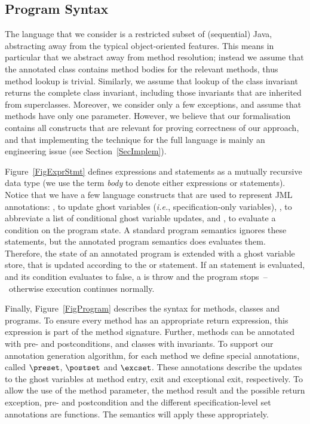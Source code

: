 \subsection{Program Syntax}\label{SecSyntax}

The language that we consider is a restricted subset of (sequential)
Java, abstracting away from the typical object-oriented features. This
means in particular that we abstract away from method resolution;
instead we assume that the annotated class contains method bodies for
the relevant methods, thus method lookup is trivial. Similarly, we
assume that lookup of the class invariant returns the complete class
invariant, including those invariants that are inherited from
superclasses. Moreover, we consider only a few exceptions, and assume
that methods have only one parameter. However, we believe that our
formalisation contains all constructs that are relevant for proving
correctness of our approach, and that implementing the technique for
the full language is mainly an engineering issue (see
Section~\ref{SecImplem}).


Figure~\ref{FigExprStmt} defines expressions and statements as a
mutually recursive data type (we use the term \emph{body} to denote
either expressions or statements). Notice that we have a few language
constructs that are used to represent JML annotations: \Set, to update
ghost variables (\emph{i.e.}, specification-only variables), \CaseJML,
to abbreviate a list of conditional ghost variable updates, and
\Assert, to evaluate a condition on the program state. A standard
program semantics ignores these statements, but the annotated program
semantics does evaluates them. Therefore, the state of an annotated
program is extended with a ghost variable store, that is updated
according to the \Set or
\CaseJML statement. If an \Assert statement is evaluated, and its
condition evaluates to false, a \JMLExc is throw and the program
stops~--~otherwise execution continues normally.


Finally, Figure~\ref{FigProgram} describes the syntax for methods,
classes and programs. To ensure every method has an appropriate return
expression, this expression is part of the method signature.  Further,
methods can be annotated with pre- and postconditions, and classes
with invariants. To support our annotation generation algorithm, for
each method we define special annotations, called
\(\preset\), \(\postset\) and \(\excset\). These annotations describe 
the updates to the ghost variables at method entry, exit and
exceptional exit, respectively. To allow the use of the method
parameter, the method result and the possible return exception, pre-
and postcondition and the different specification-level set
annotations are functions. The semantics will apply these
appropriately.

